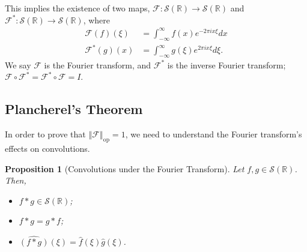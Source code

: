 \documentclass[10pt]{extarticle}
\newcommand{\R}{\mathbb{R}}
\newcommand{\norm}[1]{\left\Vert #1\right\Vert}
\theoremstyle{plain}
\newtheorem*{proposition}{Proposition}%
\theoremstyle{definition}
\theoremstyle{remark}
\begin{document}
  This implies the existence of two maps, $\mathcal{F}: \mathcal{S}(\R)\rightarrow \mathcal{S}(\R)$ and $\mathcal{F}^{\ast}:\mathcal{S}(\R)\rightarrow \mathcal{S}(\R)$, where
  \begin{align*}
    \mathcal{F}(f)(\xi) &= \int_{-\infty}^{\infty}f(x)e^{-2\pi i x \xi}dx\\
    \mathcal{F}^{\ast}(g)(x) &= \int_{-\infty}^{\infty} g(\xi)e^{2\pi i x \xi}d\xi.
  \end{align*}
  We say $\mathcal{F}$ is the Fourier transform, and $\mathcal{F}^{\ast}$ is the inverse Fourier transform; $\mathcal{F}\circ \mathcal{F}^{\ast} = \mathcal{F}^{\ast}\circ \mathcal{F} = I$.
  \subsection{Plancherel's Theorem}%
  In order to prove that $\norm{\mathcal{F}}_{\text{op}} = 1$, we need to understand the Fourier transform's effects on convolutions.
  \begin{proposition}[Convolutions under the Fourier Transform]
    Let $f,g\in \mathcal{S}(\R)$. Then,
    \begin{itemize}
      \item $f\ast g \in \mathcal{S}(\R)$;
      \item $f\ast g = g\ast f$;
      \item $\widehat{\left(f\ast g\right)}(\xi) = \hat{f}(\xi)\hat{g}(\xi)$.
    \end{itemize}
  \end{proposition}
\end{document}
